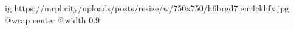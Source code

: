  
 
 
 
 

\ifcmt
  ig https://mrpl.city/uploads/posts/resize/w/750x750/h6brgd7iem4ckhfx.jpg
  @wrap center
  @width 0.9
\fi
